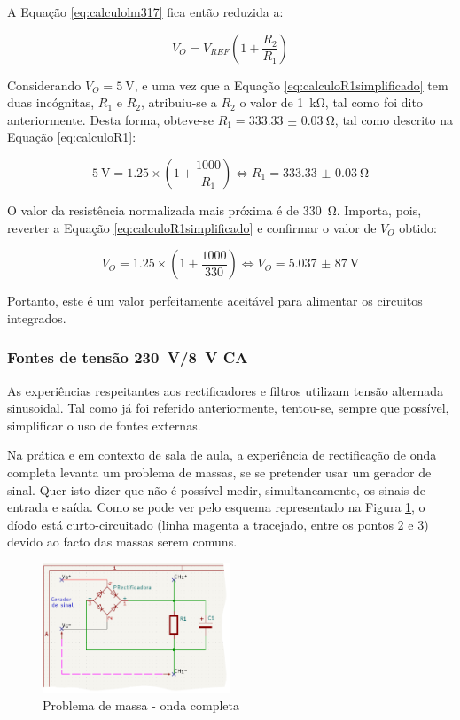 A Equação \ref{eq:calculolm317} fica então reduzida a:

\begin{equation} \label{eq:calculoR1simplificado}
	V_{O} = V_{REF} (1 + \frac{R_{2}}{R_{1}})
\end{equation}

Considerando $V_{O} = \SI{5}{\volt}$, e uma vez que a Equação \ref{eq:calculoR1simplificado} tem duas incógnitas, $R_{1}$ e $R_{2}$, atribuiu-se a $R_{2}$ o valor de \SI{1}{\kilo\ohm}, tal como foi dito anteriormente. Desta forma, obteve-se $R_{1} = \SI{333.33(3)}{\ohm}$, tal como descrito na Equação \ref{eq:calculoR1}: 

\begin{equation} \label{eq:calculoR1}
	\SI{5}{\volt} = 1.25 \times (1 + \frac{1000}{R_{1}}) \Leftrightarrow R_{1} = \SI{333.33(3)}{\ohm}
\end{equation}

O valor da resistência normalizada mais próxima é de \SI{330}{\ohm}. Importa, pois, reverter a Equação \ref{eq:calculoR1simplificado} e confirmar o valor de  $V_{O}$ obtido:

\begin{equation} \label{eq:confirmacaoVout}
	V_{O} = 1.25 \times (1 + \frac{1000}{330}) \Leftrightarrow V_{O} = \SI{5,037(87)}{\volt}
\end{equation}

Portanto, este é um valor perfeitamente aceitável para alimentar os circuitos integrados.

\subsubsection{Fontes de tensão \SI{230}{\volt}/\SI{8}{\volt} CA}
\label{sec:fontealternada}
As experiências respeitantes aos rectificadores e filtros utilizam tensão alternada sinusoidal. Tal como já foi referido anteriormente, tentou-se, sempre que possível, simplificar o uso de fontes externas. 

Na prática e em contexto de sala de aula, a experiência de rectificação de onda completa levanta um problema de massas, se se pretender usar um gerador de sinal. Quer isto dizer que não é possível medir, simultaneamente, os sinais de entrada e saída. Como se pode ver pelo esquema representado na Figura \ref{fig:gerador-massa}, o díodo está curto-circuitado (linha magenta a tracejado, entre os pontos 2 e 3) devido ao facto das massas serem comuns. 

\begin{figure}[hbtp]
	\centering
	\includegraphics[width=0.5\textwidth]{figures/sch_completa_CC.png}
	\caption{Problema de massa - onda completa}
	\label{fig:gerador-massa}
\end{figure}

